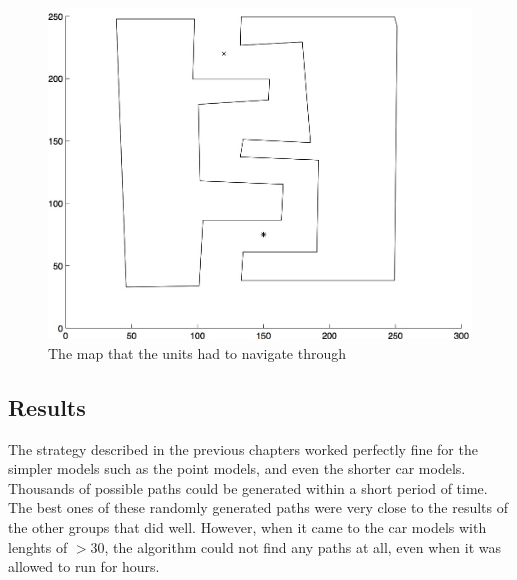 \documentclass[a4paper,12pt]{article}
\begin{document}
\begin{figure}
\centering
\includegraphics[width=0.8\linewidth]{polygonalMap}
\caption{The map that the units had to navigate through}
\label{fig:histogram}
\end{figure}

\subsection{Results}
The strategy described in the previous chapters worked perfectly fine for the simpler models such as the point models, and even the shorter car models.
Thousands of possible paths could be generated within a short period of time.
The best ones of these randomly generated paths were very close to the results of the other groups that did well.
However, when it came to the car models with lenghts of $ >30$, the algorithm could not find any paths at all, even when it was allowed to run for hours.
\end{document}
